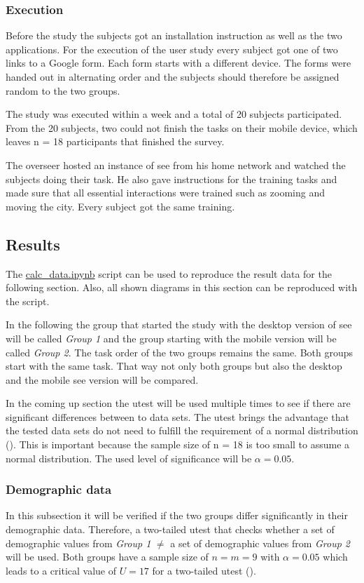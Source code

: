 \subsubsection{Execution}
Before the study the subjects got an installation instruction as well as the two applications.
For the execution of the user study every subject got one of two links to a Google form.
Each form starts with a different device. 
The forms were handed out in alternating order and the subjects should therefore be assigned random to the two groups.

The study was executed within a week and a total of 20 subjects participated.
From the 20 subjects, two could not finish the tasks on their mobile device, which leaves n = 18 participants that finished the survey.

The overseer hosted an instance of \gls{see} from his home network and watched the subjects doing their task.
He also gave instructions for the training tasks and made sure that all essential interactions were trained such as zooming and moving the \gls{city}.
Every subject got the same training.


\subsection{Results}
The \hyperref[calc]{calc\_data.ipynb} script can be used to reproduce the result data for the following section.
Also, all shown diagrams in this section can be reproduced with the script.

In the following the group that started the study with the desktop version of \gls{see} will be called \textit{Group 1} and the group starting with the mobile version will be called \textit{Group 2}.
The task order of the two groups remains the same.
Both groups start with the same task.
That way not only both groups but also the desktop and the mobile \gls{see} version will be compared. 

In the coming up section the \gls{utest} will be used multiple times to see if there are significant differences between to data sets.
The \gls{utest} brings the advantage that the tested data sets do not need to fulfill the requirement of a normal distribution (\cite{gibbons1991comparisons}).
This is important because the sample size of n = 18 is too small to assume a normal distribution.
The used level of significance will be $\alpha = 0.05$.

\label{results}
\subsubsection{Demographic data}
\label{sec:demo}
In this subsection it will be verified if the two groups differ significantly in their demographic data. 
Therefore, a two-tailed \gls{utest} that checks whether a set of demographic values from \textit{Group 1} $\neq$  a set of demographic values from \textit{Group 2} will be used.
Both groups have a sample size of $n = m = 9 $ with $\alpha = 0.05$ which leads to a critical value of $U = 17$ for a two-tailed \gls{utest} (\cite{zar2010biostatistical}).

